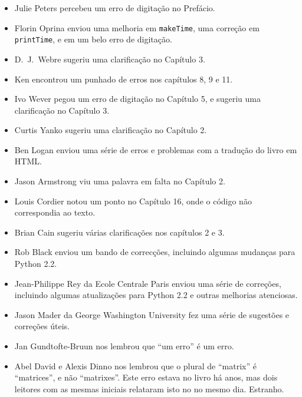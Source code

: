 \documentclass[10pt]{book}
\begin{document}
\begin {itemize}
\item Julie Peters percebeu um erro de digitação no Prefácio.

\item Florin Oprina enviou uma melhoria em {\tt makeTime},
uma correção em {\tt printTime}, e em um belo erro de digitação.

\item D.~J.~Webre sugeriu uma clarificação no Capítulo 3.

\item Ken encontrou um punhado de erros nos capítulos 8, 9 e 11.

\item Ivo Wever pegou um erro de digitação no Capítulo 5, e sugeriu uma clarificação
no Capítulo 3.

\item Curtis Yanko sugeriu uma clarificação no Capítulo 2.

\item Ben Logan enviou uma série de erros e problemas com a tradução
do livro em HTML.

\item Jason Armstrong viu uma palavra em falta no Capítulo 2.

\item Louis Cordier notou um ponto no Capítulo 16, onde o código %
não correspondia ao texto.

\item Brian Cain sugeriu várias clarificações nos capítulos 2 e 3.

\item Rob Black enviou um bando de correcções, incluindo algumas %
mudanças para Python 2.2.

\item Jean-Philippe Rey da Ecole Centrale
Paris enviou uma série de correções, incluindo algumas atualizações para Python 2.2
e outras melhorias atenciosas. %

\item Jason Mader da George Washington University fez uma série
de sugestões e correções úteis.

\item Jan Gundtofte-Bruun nos lembrou que ``um erro'' é um erro.

\item Abel David e Alexis Dinno nos lembrou que o plural de
``matrix'' é ``matrices'', e não ``matrixes''. Este erro estava no
livro há anos, mas dois leitores com as mesmas iniciais relataram isto no
no mesmo dia. Estranho. %


\end{itemize}
\end{document}
